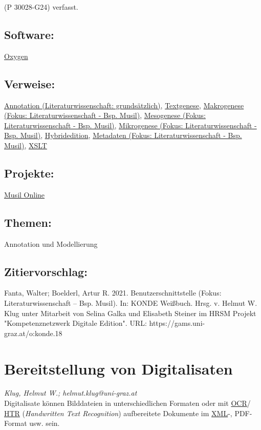 \documentclass{article}
\begin{document}
                  (P 30028-G24) verfasst.\subsection*{Software:}\href{http://oxygenxml.com/}{Oxygen}\subsection*{Verweise:}\href{https://gams.uni-graz.at/o:konde.17}{Annotation (Literaturwissenschaft:
                           grundsätzlich)}, \href{https://gams.uni-graz.at/o:konde.28}{Textgenese}, \href{https://gams.uni-graz.at/o:konde.23}{Makrogenese (Fokus:
                           Literaturwissenschaft - Bsp. Musil)}, \href{https://gams.uni-graz.at/o:konde.24}{Mesogenese (Fokus:
                           Literaturwissenschaft - Bsp. Musil)}, \href{https://gams.uni-graz.at/o:konde.26}{Mikrogenese (Fokus:
                           Literaturwissenschaft - Bsp. Musil)}, \href{https://gams.uni-graz.at/o:konde.96}{Hybridedition}, \href{https://gams.uni-graz.at/o:konde.25}{Metadaten (Fokus:
                           Literaturwissenschaft - Bsp. Musil)}, \href{https://gams.uni-graz.at/o:konde.86}{XSLT}\subsection*{Projekte:}\href{http://musilonline.at}{Musil Online}\subsection*{Themen:}Annotation und Modellierung\subsection*{Zitiervorschlag:}Fanta, Walter; Boelderl, Artur R. 2021. Benutzerschnittstelle (Fokus: Literaturwissenschaft – Bsp.
               Musil). In: KONDE Weißbuch. Hrsg. v. Helmut W. Klug unter Mitarbeit von Selina Galka und Elisabeth Steiner im HRSM Projekt "Kompetenznetzwerk Digitale Edition". URL: https://gams.uni-graz.at/o:konde.18\newpage\section*{Bereitstellung von Digitalisaten} \emph{Klug, Helmut W.; helmut.klug@uni-graz.at }\\
        
    Digitalisate können Bilddateien in unterschiedlichen Formaten oder mit \href{http://gams.uni-graz.at/o:konde.149}{OCR}/ \href{http://gams.uni-graz.at/o:konde.224}{HTR} (\emph{Handwritten Text Recognition}) aufbereitete Dokumente im \href{http://gams.uni-graz.at/o:konde.215}{XML}-, PDF-Format usw. sein. \\
            
\end{document}
